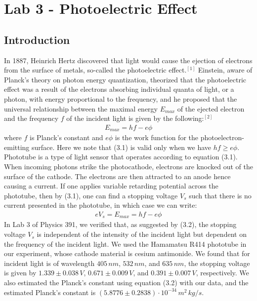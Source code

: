 \documentclass[11pt]{book}
\theoremstyle{break}
\theoremstyle{break}
\begin{document}
\newpage
\tableofcontents
{}


\setcounter{chapter}{3}
\chapter*{Lab 3 - Photoelectric Effect}
\section{Introduction}
In 1887, Heinrich Hertz discovered that light would cause the ejection of electrons from the surface of metals, so-called the photoelectric effect.$^{[1]}$ Einstein, aware of Planck's theory on photon energy quantization, theorized that the photoelectric effect was a result of the electrons absorbing individual quanta of light, or a photon, with energy proportional to the frequency, and he proposed that the universal relationship between the maximal energy $E_{max}$ of the ejected electron and the frequency $f$ of the incident light is given by the following:$^{[2]}$
\begin{align}
E_{max} = hf - e\phi
\end{align}
where $f$ is Planck's constant and $e\phi$ is the work function for the photoelectron-emitting surface. Here we note that (3.1) is valid only when we have $hf\geq e\phi$. \\

Phototube is a type of light sensor that operates according to equation (3.1). When incoming photons strike the photocathode, electrons are knocked out of the surface of the cathode. The electrons are then attracted to an anode hence causing a current. If one applies variable retarding potential across the phototube, then by (3.1), one can find a stopping voltage $V_s$ such that there is no current presented in the phototube, in which case we can write:
\begin{align}
eV_s =E_{max}= hf - e\phi
\end{align}
In Lab 3 of Physics 391, we verified that, as suggested by (3.2), the stopping voltage $V_s$ is independent of the intensity of the incident light but dependent on the frequency of the incident light. We used the Hamamatsu R414 phototube in our experiment, whose cathode material is cesium antimonide. We found that for incident light is of wavelength $405\, nm$, $532\, nm$, and $635\, nm$, the stopping voltage is given by $1.339\pm 0.038\, V$, $0.671\pm 0.009\, V$, and $0.391\pm 0.007\, V$, respectively. We also estimated the Planck's constant using equation (3.2) with our data, and the estimated Planck's constant is $(5.8776\pm 0.2838) \cdot 10^{-34}\, m^2 \, kg/s$. 
\end{document}
